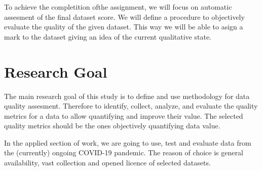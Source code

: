 To achieve the completition ofthe assignment, we will focus on automatic assesment of the final dataset score.
We will define a procedure to objectively evaluate the quality of the given dataset.
This way we will be able to asign a mark to the dataset giving an idea of the current qualitative state.

\section*{Research Goal}

The main research goal of this study is to define and use methodology for data quality assesment.
Therefore to identify, collect, analyze, and evaluate the quality metrics for a data to allow quantifying and improve their value.
The selected quality metrics should be the ones objectively quantifying data value.

In the applied section of work, we are going to use, test and evaluate data from the (currently) ongoing COVID-19 pandemic.
The reason of choice is general availability, vast collection and opened licence of selected datasets.
